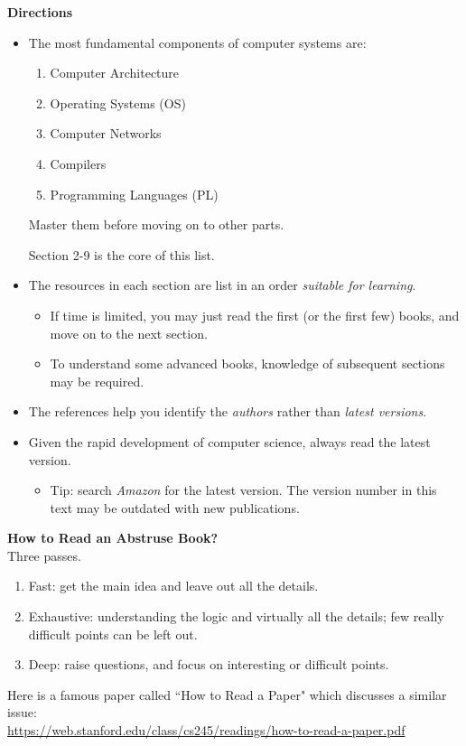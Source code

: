 \documentclass{article}
\begin{document}
\noindent
\textbf{Directions}
\begin{itemize}
    \item The most fundamental components of computer systems are:
    \begin{enumerate}
        \item Computer Architecture
        \item Operating Systems (OS)
        \item Computer Networks
        \item Compilers
        \item Programming Languages (PL)
    \end{enumerate}
    Master them before moving on to other parts.
    
    Section 2-9 is the core of this list.
    \item The resources in each section are list in an order \emph{suitable for learning}.
    \begin{itemize}
        \item If time is limited, you may just read the first (or the first few) books, and move on to the next section.
        \item To understand some advanced books, knowledge of subsequent sections may be required.
    \end{itemize}
    \item The references help you identify the \emph{authors} rather than \emph{latest versions}.
    \item Given the rapid development of computer science, always read the latest version.
    \begin{itemize}
        \item Tip: search \emph{Amazon} for the latest version. The version number in this text may be outdated with new publications.
    \end{itemize}
\end{itemize}

\noindent
\textbf{How to Read an Abstruse Book?}\\
Three passes.
\begin{enumerate}
    \item Fast: get the main idea and leave out all the details.
    \item Exhaustive: understanding the logic and virtually all the details; few really difficult points can be left out.
    \item Deep: raise questions, and focus on interesting or difficult points.
\end{enumerate}
Here is a famous paper called ``How to Read a Paper" which discusses a similar issue:\\
\href{https://web.stanford.edu/class/cs245/readings/how-to-read-a-paper.pdf}{https://web.stanford.edu/class/cs245/readings/how-to-read-a-paper.pdf}
\end{document}
